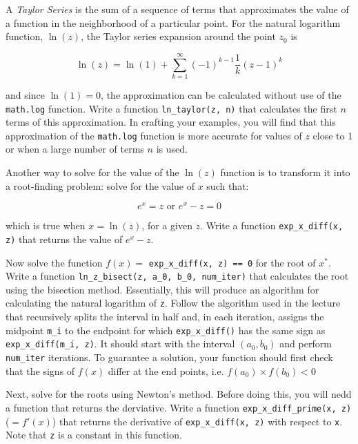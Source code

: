 \documentclass[11pt]{exam}
\begin{document}
    \begin{questions}

\question A \textit{Taylor Series} is the sum of a sequence of terms that approximates the value of a function in the neighborhood of a particular point. For the natural logarithm function, $\ln(z)$, the Taylor series expansion around the point $z_{0}$ is

$$\ln(z) = \ln(1) + \sum_{k=1}^{\infty}(-1)^{k-1}\frac{1}{k}(z-1)^{k}$$

and since $\ln(1) = 0$, the approximation can be calculated without use of the \texttt{math.log} function. Write a function \texttt{ln\_taylor(z, n)} that calculates the first $n$ terms of this approximation. In crafting your examples, you will find that this approximation of the \texttt{math.log} function is more accurate for values of $z$ close to 1 or when a large number of terms $n$ is used.

\question Another way to solve for the value of the $\ln(z)$ function is to transform it into a root-finding problem: solve for the value of $x$ such that:

$$e^{x} = z \text{ or } e^{x} - z = 0$$

which is true when $x = \ln(z)$, for a given $z$. Write a function \texttt{exp\_x\_diff(x, z)} that returns the value of $e^{x} - z$.

\question Now solve the function $f(x) = $ \texttt{exp\_x\_diff(x, z) == 0} for the root of $x^{*}$. Write a function \texttt{ln\_z\_bisect(z, a\_0, b\_0, num\_iter)} that calculates the root using the bisection method. Essentially, this will produce an algorithm for calculating the natural logarithm of \texttt{z}. Follow the algorithm used in the lecture that recursively splits the interval in half and, in each iteration, assigns the midpoint \texttt{m\_i} to the endpoint for which \texttt{exp\_x\_diff()} has the same sign as \texttt{exp\_x\_diff(m\_i, z)}. It should start with the interval $(a_{0}, b_{0})$ and perform \texttt{num\_iter} iterations. To guarantee a solution, your function should first check that the signs of $f(x)$ differ at the end points, i.e. $f(a_{0}) \times f(b_{0}) < 0$

\question Next, solve for the roots using Newton's method. Before doing this, you will nedd a function that returns the derviative. Write a function \texttt{exp\_x\_diff\_prime(x, z)} ($= f'(x)$) that returns the derivative of \texttt{exp\_x\_diff(x, z)} with respect to \texttt{x}. Note that \texttt{z} is a constant in this function.


\end{questions}
\end{document}
